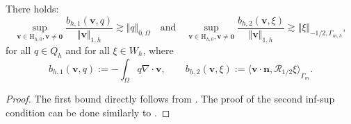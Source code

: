 \documentclass[onefignum,onetabnum,reqno,a4paper,final]{siamart250211}
\newcommand\bv{\boldsymbol{v}}
\newcommand\bn{\boldsymbol{n}}
\newcommand\0{\mathbf{0}}
\newcommand\bH{\boldsymbol{\mathrm{H}}}
\numberwithin{figure}{section}
\numberwithin{table}{section}
\begin{document}
             \begin{lemma}\label{lem:B-discoerinfsup}
        There holds:
        $$
           \sup_{\bv\in {\bH_{h,0}},\bv\neq\boldsymbol{0}}\frac{
			b_{h,1}(\bv,q) }{\Vert\bv\Vert_{1,h}}\gtrsim \Vert q\Vert_{0,\Omega} \quad
   \mbox{and} \quad
   \sup_{\bv\in {\bH_{h,0}},\bv\neq\boldsymbol{0}}\frac{
			b_{h,2}(\bv,\xi) }{\Vert\bv\Vert_{1,h}}\gtrsim \Vert \xi\Vert_{-1/2,\Gamma_{m,h}},
        $$
        for all $q\in Q_{h}$ and for all $\xi\in W_{h}$, where
        $$
        b_{h,1}(\bv,q):= -\int_\Omega q \nabla\cdot\bv, \qquad b_{h,2}(\bv,\xi):= {\langle \bv\cdot\bn,\mathcal{R}_{1/2}\xi\rangle}_{\Gamma_{m}}.
        $$
        \end{lemma}
        \begin{proof}
        The first bound directly follows from \cite[Prop. 10]{hansbo2002discontinuous}. The proof of the  second inf-sup condition can be done similarly to \cite[Corollary 3.5]{kashiwabara2019penalty}. 
        \end{proof}
        
\end{document}
